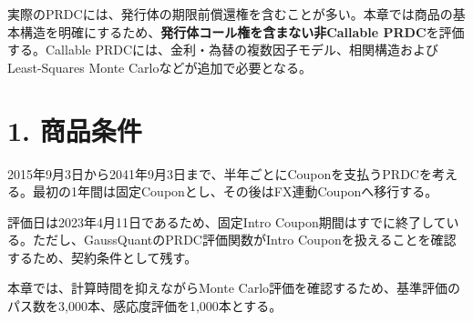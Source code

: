 \documentclass[
  letterpaper,
  DIV=11,
  numbers=noendperiod]{scrreprt}
\newenvironment{Shaded}{\begin{snugshade}}{\end{snugshade}}
\newcommand{\AttributeTok}[1]{\textcolor[rgb]{0.40,0.45,0.13}{#1}}
\newcommand{\ConstantTok}[1]{\textcolor[rgb]{0.56,0.35,0.01}{#1}}
\newcommand{\FunctionTok}[1]{\textcolor[rgb]{0.28,0.35,0.67}{#1}}
\newcommand{\NormalTok}[1]{\textcolor[rgb]{0.00,0.23,0.31}{#1}}
\newcommand{\SpecialCharTok}[1]{\textcolor[rgb]{0.37,0.37,0.37}{#1}}
\newcommand{\StringTok}[1]{\textcolor[rgb]{0.13,0.47,0.30}{#1}}
\begin{document}
実際のPRDCには、発行体の期限前償還権を含むことが多い。本章では商品の基本構造を明確にするため、\textbf{発行体コール権を含まない非Callable
PRDC}を評価する。Callable
PRDCには、金利・為替の複数因子モデル、相関構造およびLeast-Squares Monte
Carloなどが追加で必要となる。

\begin{Shaded}
\end{Shaded}

\section{1. 商品条件}\label{ux5546ux54c1ux6761ux4ef6}

2015年9月3日から2041年9月3日まで、半年ごとにCouponを支払うPRDCを考える。最初の1年間は固定Couponとし、その後はFX連動Couponへ移行する。

評価日は2023年4月11日であるため、固定Intro
Coupon期間はすでに終了している。ただし、GaussQuantのPRDC評価関数がIntro
Couponを扱えることを確認するため、契約条件として残す。

本章では、計算時間を抑えながらMonte
Carlo評価を確認するため、基準評価のパス数を3,000本、感応度評価を1,000本とする。
\end{document}

